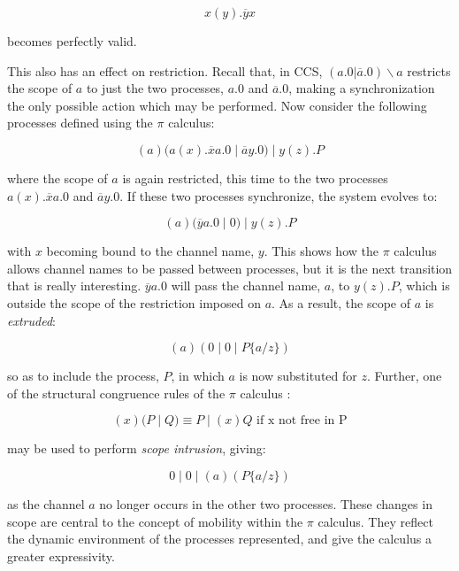 \begin{equation}
x(y).\overline{y}x
\end{equation}

\noindent becomes perfectly valid.

This also has an effect on restriction.  Recall that, in CCS,
$(a.0|\overline{a}.0)\backslash a$ restricts the scope of $a$ to just
the two processes, $a.0$ and $\overline{a}.0$, making a synchronization
the only possible action which may be performed.  Now consider the
following processes defined using the $\pi$ calculus:

\begin{equation}
(a)(a(x).\overline{x}a.0\;|\;\overline{a}y.0)\;|\;y(z).P
\end{equation}

\noindent where the scope of $a$ is again restricted, this time to the
two processes $a(x).\overline{x}a.0$ and $\overline{a}y.0$.  If these
two processes synchronize, the system evolves to:

\begin{equation}
(a)(\overline{y}a.0\;|\;0)\;|\;y(z).P
\end{equation}

\noindent with $x$ becoming bound to the channel name, $y$.  This shows
how the $\pi$ calculus allows channel names to be passed between
processes, but it is the next transition that is really interesting.
$\overline{y}a.0$ will pass the channel name, $a$, to $y(z).P$, which is
outside the scope of the restriction imposed on $a$.  As a result, the
scope of $a$ is \emph{extruded}:

\begin{equation}
(a)(0\;|\;0\;|\;P\{a/z\})
\end{equation}

\noindent so as to include the process, $P$, in which $a$ is now
substituted for $z$.  Further, one of the structural congruence rules of
the $\pi$ calculus \cite{funcproc}:

\begin{equation}
(x)(P\;|\;Q) \equiv P\;|\;(x)Q\text{ if x not free in P}
\end{equation}

\noindent may be used to perform \emph{scope intrusion}, giving:

\begin{equation}
0\;|\;0\;|\;(a)(P\{a/z\})
\end{equation}

\noindent as the channel $a$ no longer occurs in the other two
processes.  These changes in scope are central to the concept of
mobility within the $\pi$ calculus.  They reflect the dynamic
environment of the processes represented, and give the calculus a
greater expressivity.

